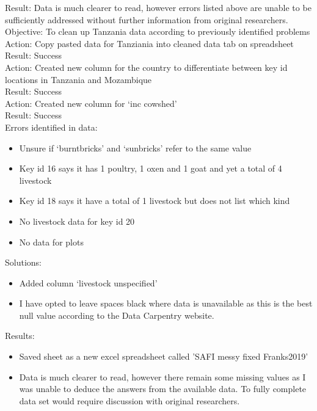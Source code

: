 \documentclass{article}
\begin{document}
Result:
Data is much clearer to read, however errors listed above are unable to be sufficiently addressed without further information from original researchers. \\

Objective: To clean up Tanzania data according to previously identified problems\\
Action: Copy pasted data for Tanziania into cleaned data tab on spreadsheet\\
Result: Success\\
Action: Created new column for the country to differentiate between key id locations in Tanzania and Mozambique\\
Result: Success\\
Action: Created new column for ‘inc cowshed’\\
Result: Success\\

Errors identified in data:
\begin{itemize}
\item Unsure if ‘burntbricks’ and ‘sunbricks’ refer to the same value
\end{itemize}
\begin{itemize}
\item Key id 16 says it has 1 poultry, 1 oxen and 1 goat and yet a total of 4 livestock
\item Key id 18 says it have a total of 1 livestock but does not list which kind
\item No livestock data for key id 20
\item No data for plots
\end{itemize}
Solutions:
\begin{itemize}
\item Added column ‘livestock unspecified’  
\item I have opted to leave spaces black where data is unavailable as this is the best null value according to the Data Carpentry website.
\end{itemize}
Results:
\begin{itemize}
\item Saved sheet as a new excel spreadsheet called 'SAFI messy fixed Franks2019'
\item Data is much clearer to read, however there remain some missing values as I was unable to deduce the answers from the available data. To fully complete data set would require discussion with original researchers. 
\end{itemize}
\end{document}
